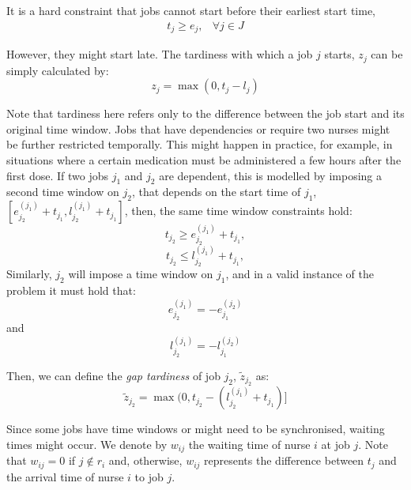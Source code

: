 \documentclass[a4paper,11pt]{elsarticle}
\begin{document}
It is a hard constraint that jobs cannot start before their earliest start time,
\begin{align}
    t_j \geq e_j, & \forall j \in J
\end{align}

However, they might start late. The tardiness with which a job $j$ starts, $z_j$ can be simply calculated by:
\begin{equation}
    z_j = \max(0, t_j - l_j)
\end{equation}

Note that tardiness here refers only to the difference between the job start and its original time window. Jobs that have dependencies or require two nurses might be further restricted temporally. This might happen in practice, for example, in situations where a certain medication must be administered a few hours after the first dose. If two jobs $j_1$ and $j_2$ are dependent, this is modelled by imposing a second time window on $j_2$, that depends on the start time of $j_1$, $[e^{(j_1)}_{j_2} + t_{j_1}, l^{(j_1)}_{j_2} + t_{j_1}]$, then, the same time window constraints hold:
\begin{equation}
    t_{j_2} \geq e^{(j_1)}_{j_2} + t_{j_1}, %
\end{equation}
\begin{equation}
    t_{j_2} \leq l^{(j_1)}_{j_2} + t_{j_1}, %
\end{equation}
Similarly, $j_2$ will impose a time window on $j_1$, and in a valid instance of the problem it must hold that:
\begin{equation}
    e^{(j_1)}_{j_2} = -e^{(j_2)}_{j_1}
\end{equation}
and
\begin{equation}
    l^{(j_1)}_{j_2} = -l^{(j_2)}_{j_1}
\end{equation}

Then, we can define the \emph{gap tardiness} of job $j_2$, $\tilde{z}_{j_2}$ as:
\begin{equation}
    \tilde{z}_{j_2} = \max(0, t_{j_2} - (l^{(j_1)}_{j_2} + t_{j_1})]
\end{equation}

Since some jobs have time windows or might need to be synchronised, waiting times might occur. We denote by $w_{ij}$ the waiting time of nurse $i$ at job $j$. Note that $w_{ij} = 0$ if $j \notin r_i$ and, otherwise, $w_{ij}$ represents the difference between $t_j$ and the arrival time of nurse $i$ to job $j$.%
\end{document}
